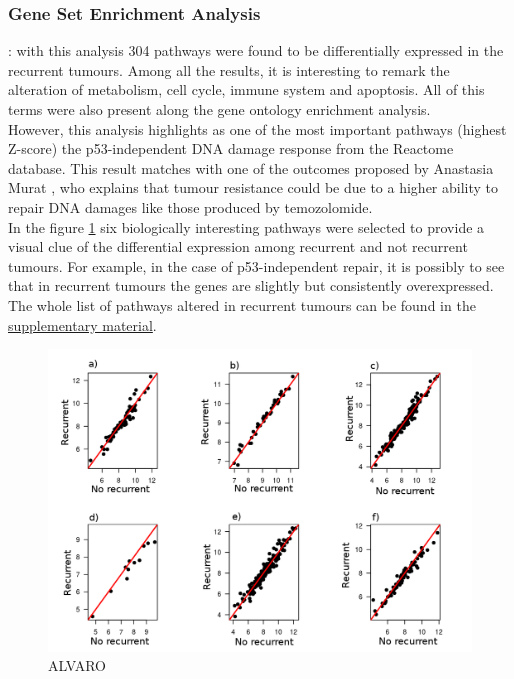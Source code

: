 \documentclass[9pt,twocolumn,twoside]{gsajnl}
\begin{document}
\subsubsection*{Gene Set Enrichment Analysis}: with this analysis 304 pathways were found to be differentially expressed in the recurrent tumours. Among all the results, it is interesting to remark the alteration of metabolism, cell cycle, immune system and apoptosis. All of this terms were also present along the gene ontology enrichment analysis.\\
However, this analysis highlights as one of the most important pathways (highest Z-score) the p53-independent DNA damage response from the Reactome database. This result matches with one of the outcomes proposed by Anastasia Murat \citep{Murat2008}, who explains that tumour resistance could be due to a higher ability to repair DNA damages like those produced by temozolomide.\\
In the figure \ref{fig:gsea} six biologically interesting pathways were selected to provide a visual clue of the differential expression among recurrent and not recurrent tumours. For example, in the case of p53-independent repair, it is possibly to see that in recurrent tumours the genes are slightly but consistently overexpressed.\\
The whole list of pathways altered in recurrent tumours can be found in the \href{http://ieoproject.tk/ieo/abella_casals_miravet.html}{supplementary material}.

\begin{figure}[!h]
	\centering
	\includegraphics[scale=0.4]{gsea.png}
	\caption{ ALVARO }
	\label{fig:gsea}
\end{figure}
\end{document}
